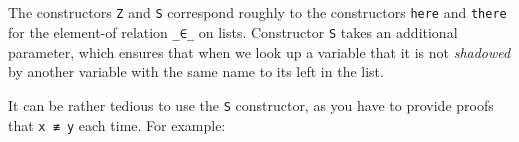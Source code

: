 \begin{fence}
\begin{code}
\AgdaSpace{}%
\AgdaSymbol{\{}\AgdaSpace{}%
\AgdaSpace{}%
\AgdaSpace{}%
\AgdaSpace{}%
\AgdaSymbol{\}}\<%
\\
\>[.][@{}l@{}]\<[1553I]%
\>[4]\AgdaSpace{}%
\AgdaSpace{}%
\AgdaSpace{}%
\<%
\\
%
\>[4]%
\>[1563I]\AgdaSpace{}%
\AgdaSpace{}%
\AgdaSpace{}%
\AgdaSpace{}%
\<%
\\
\>[.][@{}l@{}]\<[1563I]%
\>[6]\AgdaComment{------------------}\<%
\\
%
\>[4]\AgdaSpace{}%
\AgdaSpace{}%
\AgdaOperator{\AgdaInductiveConstructor{,}}\AgdaSpace{}%
\AgdaSpace{}%
\AgdaSpace{}%
\AgdaSpace{}%
\AgdaSpace{}%
\AgdaSpace{}%
\AgdaSpace{}%
\<%
\end{code}
\end{fence}

The constructors \texttt{Z} and \texttt{S} correspond roughly to the
constructors \texttt{here} and \texttt{there} for the element-of
relation \texttt{\_∈\_} on lists. Constructor \texttt{S} takes an
additional parameter, which ensures that when we look up a variable that
it is not \emph{shadowed} by another variable with the same name to its
left in the list.

It can be rather tedious to use the \texttt{S} constructor, as you have
to provide proofs that \texttt{x\ ≢\ y} each time. For example:

